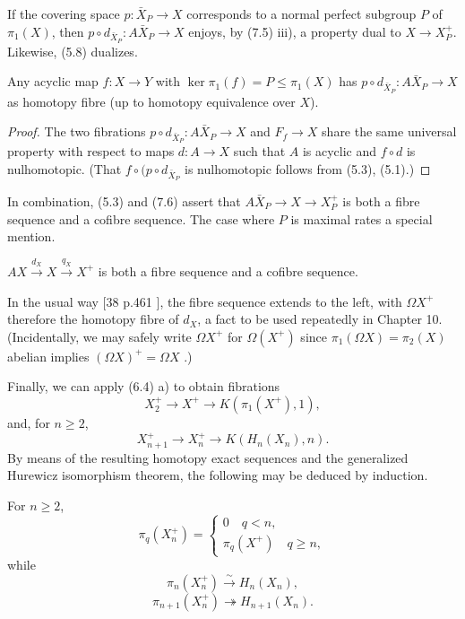 If the covering space $p \colon   \bar{X}_P \longrightarrow  X$ corresponds to a normal perfect subgroup $P$ of $\pi_1(X)$, then
$p \circ  d_{\bar{X}_P}\colon   A\bar{X}_P\longrightarrow X$ enjoys, by (7.5) iii), a property dual to $X \longrightarrow  X_P^+$. Likewise, (5.8) dualizes.
\begin{prop}
  Any acyclic map $f\colon  X\longrightarrow Y$ with $\ker\pi_1(f) = P\leqslant \pi_1(X)$ has
$p \circ  d_{\bar{X}_P}\colon   A\bar{X}_P\longrightarrow X$ as homotopy fibre (up to homotopy equivalence over $X$).
\end{prop}
\begin{proof}
The two fibrations $p \circ  d_{\bar{X}_P}\colon   A\bar{X}_P\longrightarrow X$ and $F_f\longrightarrow X$ share the same universal property with respect to maps $d \colon   A \longrightarrow X$ such that $A$ is acyclic and $f\circ d$ is nulhomotopic. (That $f\circ (p\circ d_{\bar{X}_P}$ is nulhomotopic follows from (5.3), (5.1).)
\end{proof}
In combination, (5.3) and (7.6) assert that $A\bar{X}_P \longrightarrow X \rightarrow  X_P^+$ is both a fibre sequence and a cofibre sequence. The case where $P$ is maximal rates a special mention.
\begin{theorem}
$AX \overset{d_X}{\longrightarrow} X \overset{q_X}{\longrightarrow} X^+$ is both a fibre sequence and a cofibre sequence.
\end{theorem}
In the usual way [38 p.461 ], the fibre sequence extends to the left, with $\Omega X^+$ therefore the homotopy fibre of $d_X$, a fact to be used repeatedly in Chapter 10. (Incidentally, we may safely write $\Omega X^+$ for $\Omega(X^+)$ since $\pi_1(\Omega X) = \pi_2(X)$ abelian implies $(\Omega X)^+ = \Omega X$ .)

Finally, we can apply (6.4) a) to obtain fibrations
\[X_2^+\longrightarrow X^+ \longrightarrow K(\pi_1(X^+), 1),\]
 and, for $n \geqslant 2$,
 \[X_{n+1}^+\longrightarrow X_n^+ \longrightarrow K(H_n(X_n), n).\]
By means of the resulting homotopy exact sequences and the generalized Hurewicz isomorphism theorem, the following may be deduced by induction.
\begin{corollary}
  For $n \geqslant 2$,
\begin{equation*}
\pi_q(X_n^+)=
  \begin{cases}
0 \quad q<n, \\
\pi_q(X^+) \quad q\geqslant n,
\end{cases}
\end{equation*}
while
\[\pi_n(X_n^+)\overset{\sim}{\longrightarrow} H_n(X_n),\]
\[\pi_{n+1}(X_n^+)\twoheadrightarrow H_{n+1}(X_n).\]
 \end{corollary} 

